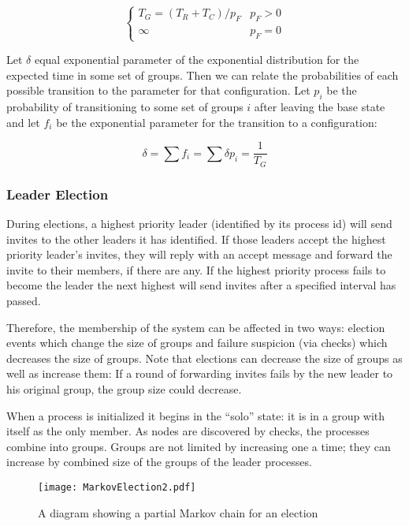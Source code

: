 \begin{equation}
\begin{cases}
T_{G} = ( T_{R}+T_{C}  ) / p_{F} & p_{F} > 0 \\
\infty & p_{F} = 0
\end{cases}
\end{equation}

Let $\delta$ equal exponential parameter of the exponential distribution for the expected time in some
set of groups. Then
we can relate the probabilities of each possible transition to the parameter for that configuration. Let
$p_{i}$ be the probability of transitioning to some set of groups $i$ after leaving the base state and let
$f_{i}$ be the exponential parameter for the transition to a configuration:

\begin{equation}
\delta = \sum f_{i} = \sum \delta p_{i} = \frac{1}{T_{G}}
\end{equation}


\subsubsection{Leader Election}
During elections, a highest priority leader (identified by its process id) will
send invites to the other leaders it has identified. If those leaders accept
the highest priority leader's invites, they will reply with an accept message
and forward the invite to their members, if there are any. If the highest
priority process fails to become the leader the next highest will send invites
after a specified interval has passed.

Therefore, the membership of the system can be affected in two ways: election
events which change the size of groups and failure suspicion (via checks) which
decreases the size of groups. Note that elections can decrease the size of
groups as well as increase them: If a round of forwarding invites fails by the
new leader to his original group, the group size could decrease.

When a process is initialized it begins in the ``solo'' state: it is in a group
with itself as the only member. As nodes are discovered by checks, the
processes combine into groups. Groups are not limited by increasing one a time;
they can increase by combined size of the groups of the leader processes.



\begin{figure*}
\centering
\texttt{[image: MarkovElection2.pdf]}
\caption{A diagram showing a partial Markov chain for an election}
\label{fig:MARKOVELECTION}
\end{figure*}

